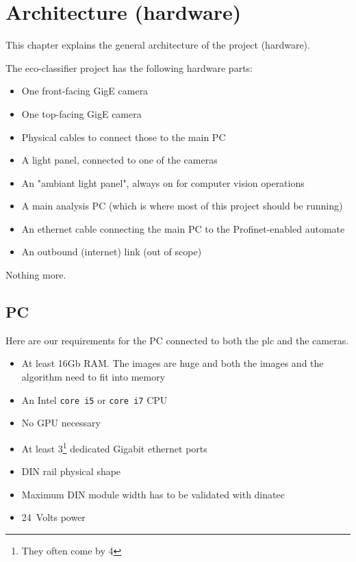 \chapter{Architecture (hardware)}
\label{chapter:hardwarearchitecture}

This chapter explains the general architecture of the project (hardware).


The eco-classifier project has the following hardware parts:

\begin{itemize}
    \item One front-facing GigE camera
    \item One top-facing GigE camera
    \item Physical cables to connect those to the main PC
    \item A light panel, connected to one of the cameras
    \item An "ambiant light panel", always on for computer vision operations
    \item A main analysis PC (which is where most of this project should be running)
    \item An ethernet cable connecting the main PC to the Profinet-enabled automate
    \item An outbound (internet) link (out of scope)
\end{itemize}

Nothing more.


\section{PC}

Here are our requirements for the PC connected to both the \gls{plc} and the cameras.

\begin{itemize}
    \item At least 16Gb RAM. The images are huge and both the images and the algorithm need to fit into memory
    \item An Intel \texttt{core i5} or \texttt{core i7} CPU
    \item No GPU necessary
    \item At least 3\footnote{They often come by 4} dedicated Gigabit ethernet ports
    \item DIN rail physical shape
    \item Maximum DIN module width has to be validated with \gls{dinatec}
    \item 24~Volts power
\end{itemize}

